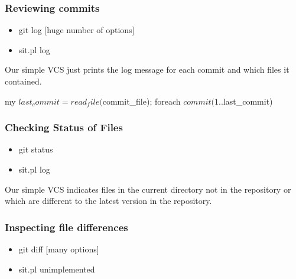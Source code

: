 \begin{frame}
\frametitle{Reviewing commits}
\begin{itemize}
\item  git log [huge number of options]
\item  sit.pl log
\end{itemize}

Our simple VCS just prints the log message for each commit and
which files it contained.

\begin{small}
\begin{perl}
my $last_commit = read_file($commit_file);
foreach $commit (1..$last_commit) {
}
\end{perl}
\end{small}
\end{frame}

\begin{frame}
\frametitle{Checking Status of Files}
\begin{itemize}
\item  git status 
\item  sit.pl log
\end{itemize}

Our simple VCS indicates files in the current directory
not in the repository or which are different to the latest version in the repository.

\begin{small}
\end{small}
\end{frame}

\begin{frame}
\frametitle{Inspecting file differences}
\begin{itemize}
\item  git diff [many options]
\item  sit.pl unimplemented
\end{itemize}
\end{frame}

